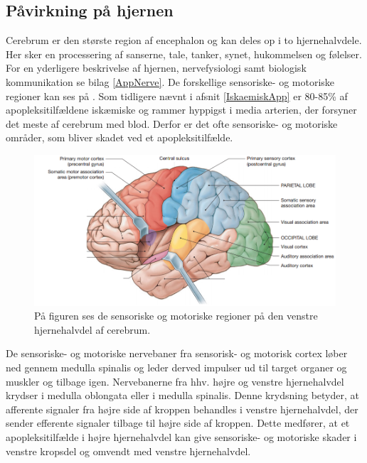\subsection{Påvirkning på hjernen}\label{HjerneSenMot}

Cerebrum er den største region af encephalon og kan deles op i to hjernehalvdele. Her sker en processering af sanserne, tale, tanker, synet, hukommelsen og følelser. \cite{Martini2012} For en yderligere beskrivelse af hjernen, nervefysiologi samt biologisk kommunikation se bilag \ref{AppNerve}. De forskellige sensoriske- og motoriske regioner kan ses på . Som tidligere nævnt i afsnit \ref{IskaemiskApp} er 80-85\% af apopleksitilfældene iskæmiske og rammer hyppigst i media arterien, der forsyner det meste af cerebrum med blod. Derfor er det ofte sensoriske- og motoriske områder, som bliver skadet ved et apopleksitilfælde. \cite{Sundhed.dk,Gade2004,Boss2010} \\

\begin{figure}[H]
	\centering
	\includegraphics[scale=0.6]{figures/bProblemanalyse/Encephalon.png}
	\caption{På figuren ses de sensoriske og motoriske regioner på den venstre hjernehalvdel af cerebrum. \cite{Martini2012}}
	\label{Enc}
\end{figure}

De sensoriske- og motoriske nervebaner fra sensorisk- og motorisk cortex løber ned gennem medulla spinalis og leder derved impulser ud til target organer og muskler og tilbage igen. Nervebanerne fra hhv. højre og venstre hjernehalvdel krydser i medulla oblongata eller i medulla spinalis. Denne krydsning betyder, at afferente signaler fra højre side af kroppen behandles i venstre hjernehalvdel, der sender efferente signaler tilbage til højre side af kroppen. \cite{Martini2012,Stanfield2014} Dette medfører, at et apopleksitilfælde i højre hjernehalvdel kan give sensoriske- og motoriske skader i venstre kropsdel og omvendt med venstre hjernehalvdel. \cite{Sundhedsstyrelsen2009,Nichols1997} %

